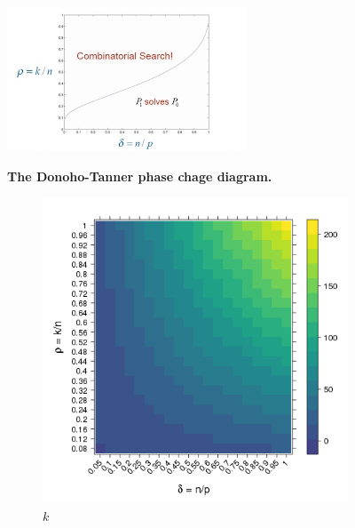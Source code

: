 \documentclass[a4paper]{amsart}
\begin{document}
 \begin{figure}[tbhp] 
     \caption{\textbf{The Donoho-Tanner phase chage diagram.}}
     \centering
     \includegraphics[totalheight=6cm]{../plos16/figs/phase.png} 
     \label{figure:phase-diagram-equivalence.png} 
     \vspace{4ex}
 \end{figure}

\begin{figure}[tbhp] 
    \begin{subfigure}[b]{0.45\linewidth}
      \centering
      \includegraphics[totalheight=6cm]{../plos16/figs/k.png}
      \caption{$k$}
      \label{figure:k.png}
    \end{subfigure} 
    \begin{subfigure}[b]{0.45\linewidth}
      \centering

\end{subfigure}
\end{figure}
\end{document}
